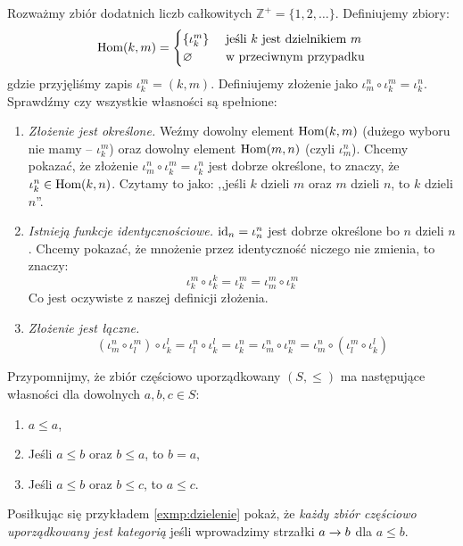 \begin{exmp}
  \label{exmp:dzielenie}
  {\newcommand{\divs}[2]{\iota_{#1}^{#2}}
  Rozważmy zbiór dodatnich liczb całkowitych $\mathbb Z^+=\{1, 2, \dots\}$. Definiujemy zbiory:
  $$
  \Mor km =
  \begin{cases}
    \{ \divs km \} &\text{ jeśli $k$ jest dzielnikiem $m$}\\
    \varnothing    &\text{ w przeciwnym przypadku}
  \end{cases}
  $$
  gdzie przyjęliśmy zapis $\divs km=(k, m)$.
  Definiujemy złożenie jako $\divs mn  \circ  \divs km = \divs kn$.
  Sprawdźmy czy wszystkie własności są spełnione:
  \begin{enumerate}
    \item \emph{Złożenie jest określone.} Weźmy dowolny element $\textrm{Hom}(k, m)$ (dużego wyboru nie mamy -- $\divs km$) oraz dowolny element $\textrm{Hom}(m, n)$ (czyli $\divs mn$). Chcemy pokazać, że złożenie $\divs mn \circ \divs km = \divs kn$ jest dobrze określone, to znaczy, że $\divs kn \in \Mor kn$. Czytamy to jako: ,,jeśli $k$ dzieli $m$ oraz $m$ dzieli $n$, to $k$ dzieli $n$''.
    \item \emph{Istnieją funkcje identycznościowe.} $\id n = \divs nn$ jest dobrze określone bo $n$ dzieli $n$. Chcemy pokazać, że mnożenie przez identyczność niczego nie zmienia, to znaczy:
      $$\divs km \circ \divs kk = \divs km = \divs mm \circ \divs km$$
      Co jest oczywiste z naszej definicji złożenia.
    \item \emph{Złożenie jest łączne.} $$(\divs mn \circ \divs lm) \circ  \divs kl  = \divs ln \circ \divs kl = \divs kn = \divs mn \circ \divs km = \divs mn \circ (\divs lm \circ  \divs kl)$$
  \end{enumerate}
  }
\end{exmp}

\begin{exc}
  Przypomnijmy, że zbiór częściowo uporządkowany $(S, \le)$ ma następujące własności dla dowolnych $a, b, c \in S$:
  \begin{enumerate}
    \item $a\le a$,
    \item Jeśli $a\le b$ oraz $b\le a$, to $b=a$,
    \item Jeśli $a\le b$ oraz $b\le c$, to $a\le c$.
  \end{enumerate}
  Posiłkując się przykładem \ref{exmp:dzielenie} pokaż, że \emph{każdy zbiór częściowo uporządkowany jest kategorią} jeśli wprowadzimy strzałki $a \xrightarrow{} b$ dla $a\le b$.
\end{exc}


